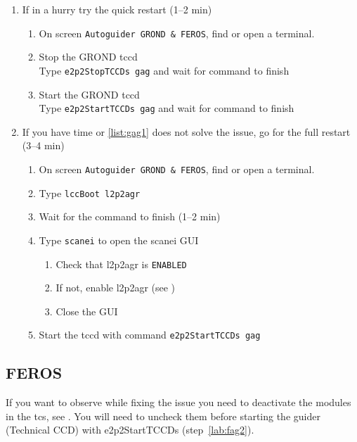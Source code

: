 \documentclass[11pt,fleqn,a4paper]{book}
\begin{document}
\label{proc:restartgag}
\begin{enumerate}
   \item\label{list:gag1} If in a hurry try the quick restart (1--2 min)
   \begin{enumerate}
       \item On screen \texttt{Autoguider GROND \& FEROS}, find or open a terminal.
       \item Stop the GROND \acrlong{tccd}\\
             Type \texttt{\gls{e2p2StopTCCDs} gag} and wait for command to finish
       \item Start the GROND \acrlong{tccd}\\
             Type \texttt{\gls{e2p2StartTCCDs} gag} and wait for command to finish
   \end{enumerate}
   \item If you have time or \ref{list:gag1} does not solve the issue,
   go for the full restart (3--4 min)
   \begin{enumerate}
       \item On screen \texttt{Autoguider GROND \& FEROS}, find or open a terminal.
       \item Type \texttt{\gls{lccBoot} \gls{l2p2agr}}
       \item Wait for the command to finish (1--2 min)
       \item Type \texttt{scanei} to open the scanei GUI
       \begin{enumerate}
	   \item Check that l2p2agr is \texttt{ENABLED}
	   \item If not, enable l2p2agr (see )
	   \item Close the GUI
       \end{enumerate}
       \item Start the \acrlong{tccd} with command \texttt{\gls{e2p2StartTCCDs} gag}
   \end{enumerate}
\end{enumerate}

\subsection{FEROS}
If you want to observe while fixing the issue you need to deactivate the modules in the \gls{tcs}, see .  You will need to uncheck them before starting the guider (Technical CCD) with \gls{e2p2StartTCCDs} (step~\ref{lab:fag2}). 
\end{document}
